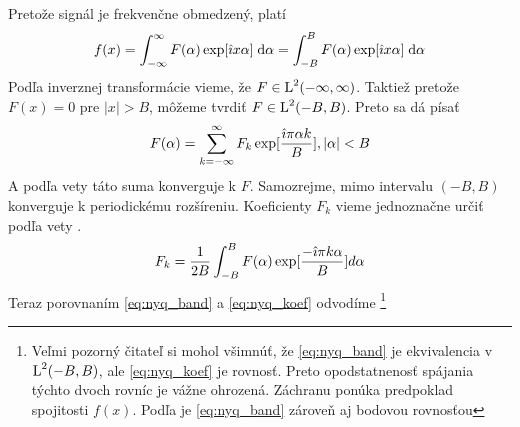 \begin{dokaz}
    Pretože signál je frekvenčne obmedzený, platí
    \begin{equation}
        f(x) = \int_{-\infty}^{\infty} F(\alpha) \exp[ \hat{\imath} x \alpha]
        \; \mathrm{d}\alpha = \int_{-B}^{B} F(\alpha) \exp[ \hat{\imath} x \alpha]
        \; \mathrm{d}\alpha
        \label{eq:nyq_band}
    \end{equation}
    Podľa inverznej transformácie vieme, že $F \in \mbox{L}^2(-\infty,\infty)$. Taktiež
    pretože $F(x) = 0$ pre $|x| > B$, môžeme tvrdiť $F \in \mbox{L}^2(-B,B)$.
    Preto sa dá písať    
    \begin{equation}
        F(\alpha) = \sum_{k=-\infty}^{\infty} F_k \exp[\frac{\hat{\imath} \pi
        \alpha k}{B}], |\alpha|<B
        \label{eq:nyq_series}
    \end{equation}
    A podľa vety \todo{} táto suma konverguje k $F$. 
    Samozrejme, mimo intervalu $(-B,B)$ konverguje k periodickému
    rozšíreniu.
    Koeficienty $F_k$ vieme jednoznačne určiť podľa vety \todo{}.
    \begin{equation}
        F_k = \frac{1}{2B} \int_{-B}^{B} F(\alpha) \exp[\frac{- \hat{\imath}
        \pi k \alpha}{B}] d\alpha
        \label{eq:nyq_koef}
    \end{equation}
    Teraz porovnaním \eqref{eq:nyq_band} a \eqref{eq:nyq_koef} odvodíme        
    \footnote{Veľmi pozorný čitateľ si mohol všimnúť, že
        \eqref{eq:nyq_band} je ekvivalencia v $\mbox{L}^2(-B,B)$, ale
        \eqref{eq:nyq_koef} je rovnosť. Preto
        opodstatnenosť spájania týchto dvoch rovníc je vážne ohrozená.
        Záchranu ponúka predpoklad spojitosti $f(x)$. Podľa \todo{} je
        \eqref{eq:nyq_band} zároveň aj bodovou rovnosťou}
    

\end{dokaz}
